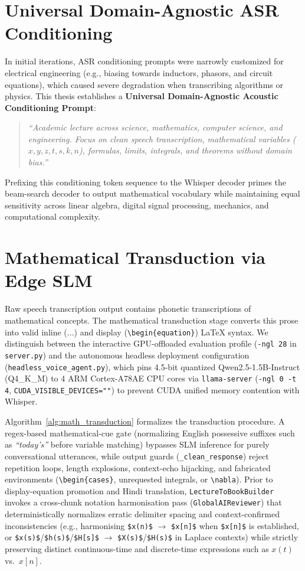 \documentclass[11pt,a4paper,oneside]{report}
\begin{document}
\section{Universal Domain-Agnostic ASR Conditioning}
\label{sec:universal_prompt}
In initial iterations, ASR conditioning prompts were narrowly customized for electrical engineering (e.g., biasing towards inductors, phasors, and circuit equations), which caused severe degradation when transcribing algorithms or physics. This thesis establishes a \textbf{Universal Domain-Agnostic Acoustic Conditioning Prompt}:
\begin{quote}
\small
\textit{``Academic lecture across science, mathematics, computer science, and engineering. Focus on clean speech transcription, mathematical variables ($x, y, z, t, s, k, n$), formulas, limits, integrals, and theorems without domain bias.''}
\end{quote}
Prefixing this conditioning token sequence to the Whisper decoder primes the beam-search decoder to output mathematical vocabulary while maintaining equal sensitivity across linear algebra, digital signal processing, mechanics, and computational complexity.

\section{Mathematical Transduction via Edge SLM}
Raw speech transcription output contains phonetic transcriptions of mathematical concepts. The mathematical transduction stage converts this prose into valid inline ($...$) and display (\texttt{\textbackslash begin\{equation\}}) LaTeX syntax. We distinguish between the interactive GPU-offloaded evaluation profile (\texttt{-ngl 28} in \texttt{server.py}) and the autonomous headless deployment configuration (\texttt{headless\_voice\_agent.py}), which pins 4.5-bit quantized Qwen2.5-1.5B-Instruct (Q4\_K\_M) to 4 ARM Cortex-A78AE CPU cores via \texttt{llama-server} (\texttt{-ngl 0 -t 4}, \texttt{CUDA\_VISIBLE\_DEVICES=""}) to prevent CUDA unified memory contention with Whisper.

Algorithm~\ref{alg:math_transduction} formalizes the transduction procedure. A regex-based mathematical-cue gate (normalizing English possessive suffixes such as \textit{``today's''} before variable matching) bypasses SLM inference for purely conversational utterances, while output guards (\texttt{\_clean\_response}) reject repetition loops, length explosions, context-echo hijacking, and fabricated environments (\texttt{\textbackslash begin\{cases\}}, unrequested integrals, or \texttt{\textbackslash nabla}). Prior to display-equation promotion and Hindi translation, \texttt{LectureToBookBuilder} invokes a cross-chunk notation harmonisation pass (\texttt{GlobalAIReviewer}) that deterministically normalizes erratic delimiter spacing and context-confirmed inconsistencies (e.g., harmonising \texttt{\$x(n)\$} $\to$ \texttt{\$x[n]\$} when \texttt{\$x[n]\$} is established, or \texttt{\$x(s)\$}/\texttt{\$h(s)\$}/\texttt{\$H[s]\$} $\to$ \texttt{\$X(s)\$}/\texttt{\$H(s)\$} in Laplace contexts) while strictly preserving distinct continuous-time and discrete-time expressions such as $x(t)$ vs.\ $x[n]$.
\end{document}
